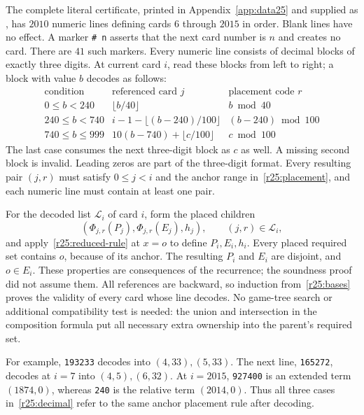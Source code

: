 The complete literal certificate, printed in Appendix~\ref{app:data25}
and supplied as , has $2010$ numeric lines
defining cards $6$ through $2015$ in order.  Blank lines have no
effect.  A marker \texttt{\# n} asserts that the next card number is
$n$ and creates no card.  There are $41$ such markers.  Every numeric
line consists of decimal blocks of exactly three digits.  At current
card $i$, read these blocks from left to right; a block with value $b$
decodes as follows:
\begin{equation}\label{r25:decimal}
\begin{array}{c|c|c}
\text{condition}&\text{referenced card }j&\text{placement code }r\\ \hline
0\leq b<240&\lfloor b/40\rfloor&b\bmod40\\
240\leq b<740&i-1-\lfloor(b-240)/100\rfloor&(b-240)\bmod100\\
740\leq b\leq999&10(b-740)+\lfloor c/100\rfloor&c\bmod100
\end{array}
\end{equation}
The last case consumes the next three-digit block as $c$ as well.
A missing second block is invalid.  Leading zeros are part of the
three-digit format.  Every resulting pair $(j,r)$ must satisfy
$0\leq j<i$ and the anchor range in~\eqref{r25:placement}, and each
numeric line must contain at least one pair.

For the decoded list $\mathcal L_i$ of card $i$, form the placed
children
\[
 (\Phi_{j,r}(P_j),\Phi_{j,r}(E_j),h_j),\qquad (j,r)\in\mathcal L_i,
\]
and apply~\eqref{r25:reduced-rule} at $x=o$ to define $P_i,E_i,h_i$.
Every placed required set contains $o$, because of its anchor.
The resulting $P_i$ and $E_i$ are disjoint, and $o\in E_i$.
These properties are consequences of the recurrence; the soundness
proof did not assume them.  All references are backward, so induction
from~\eqref{r25:bases} proves the validity of every card whose line
decodes.  No game-tree search or additional compatibility test is
needed: the union and intersection in the composition formula put
all necessary extra ownership into the parent's required set.

For example, \texttt{193233} decodes into $(4,33),(5,33)$.
The next line, \texttt{165272}, decodes at $i=7$ into $(4,5),(6,32)$.
At $i=2015$, \texttt{927400} is an extended term $(1874,0)$,
whereas \texttt{240} is the relative term $(2014,0)$.
Thus all three cases in~\eqref{r25:decimal} refer to the same
anchor placement rule after decoding.

